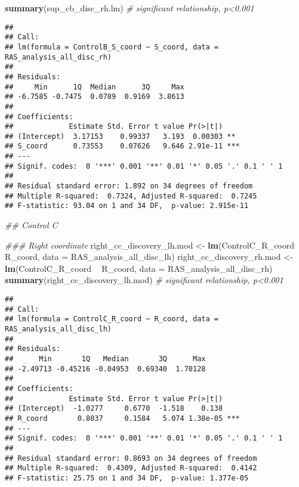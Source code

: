 \documentclass[
]{article}
\newenvironment{Shaded}{\begin{snugshade}}{\end{snugshade}}
\newcommand{\CommentTok}[1]{\textcolor[rgb]{0.56,0.35,0.01}{\textit{#1}}}
\newcommand{\DataTypeTok}[1]{\textcolor[rgb]{0.13,0.29,0.53}{#1}}
\newcommand{\KeywordTok}[1]{\textcolor[rgb]{0.13,0.29,0.53}{\textbf{#1}}}
\newcommand{\NormalTok}[1]{#1}
\newcommand{\OperatorTok}[1]{\textcolor[rgb]{0.81,0.36,0.00}{\textbf{#1}}}
\newcommand{\StringTok}[1]{\textcolor[rgb]{0.31,0.60,0.02}{#1}}
\begin{document}
\begin{Shaded}
\begin{Highlighting}[]
\KeywordTok{summary}\NormalTok{(sup_cb_disc_rh.lm) }\CommentTok{# significant relationship, p<0.001}
\end{Highlighting}
\end{Shaded}

\begin{verbatim}
## 
## Call:
## lm(formula = ControlB_S_coord ~ S_coord, data = RAS_analysis_all_disc_rh)
## 
## Residuals:
##     Min      1Q  Median      3Q     Max 
## -6.7585 -0.7475  0.0789  0.9169  3.8613 
## 
## Coefficients:
##             Estimate Std. Error t value Pr(>|t|)    
## (Intercept)  3.17153    0.99337   3.193  0.00303 ** 
## S_coord      0.73553    0.07626   9.646 2.91e-11 ***
## ---
## Signif. codes:  0 '***' 0.001 '**' 0.01 '*' 0.05 '.' 0.1 ' ' 1
## 
## Residual standard error: 1.892 on 34 degrees of freedom
## Multiple R-squared:  0.7324, Adjusted R-squared:  0.7245 
## F-statistic: 93.04 on 1 and 34 DF,  p-value: 2.915e-11
\end{verbatim}

\begin{Shaded}
\begin{Highlighting}[]
\CommentTok{## Control C }

\CommentTok{### Right coordinate}
\NormalTok{right_cc_discovery_lh.mod <-}\StringTok{ }\KeywordTok{lm}\NormalTok{(ControlC_R_coord }\OperatorTok{~}\StringTok{ }\NormalTok{R_coord, }\DataTypeTok{data =}\NormalTok{ RAS_analysis_all_disc_lh)}
\NormalTok{right_cc_discovery_rh.mod <-}\StringTok{ }\KeywordTok{lm}\NormalTok{(ControlC_R_coord }\OperatorTok{~}\StringTok{ }\NormalTok{R_coord, }\DataTypeTok{data =}\NormalTok{ RAS_analysis_all_disc_rh)}
\KeywordTok{summary}\NormalTok{(right_cc_discovery_lh.mod) }\CommentTok{# significant relationship, p<0.001}
\end{Highlighting}
\end{Shaded}

\begin{verbatim}
## 
## Call:
## lm(formula = ControlC_R_coord ~ R_coord, data = RAS_analysis_all_disc_lh)
## 
## Residuals:
##      Min       1Q   Median       3Q      Max 
## -2.49713 -0.45216 -0.04953  0.69340  1.70128 
## 
## Coefficients:
##             Estimate Std. Error t value Pr(>|t|)    
## (Intercept)  -1.0277     0.6770  -1.518    0.138    
## R_coord       0.8037     0.1584   5.074 1.38e-05 ***
## ---
## Signif. codes:  0 '***' 0.001 '**' 0.01 '*' 0.05 '.' 0.1 ' ' 1
## 
## Residual standard error: 0.8693 on 34 degrees of freedom
## Multiple R-squared:  0.4309, Adjusted R-squared:  0.4142 
## F-statistic: 25.75 on 1 and 34 DF,  p-value: 1.377e-05
\end{verbatim}
\end{document}

